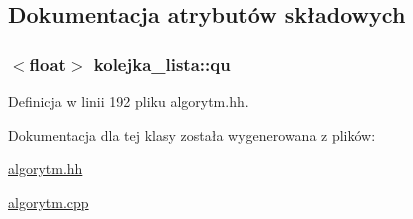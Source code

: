 \subsection{Dokumentacja atrybutów składowych}
\hypertarget{classkolejka__lista_a5e378458ccfc86d903b1a71a8ff5bad8}{
\subsubsection[{qu}]{$<$float$>$ kolejka\-\_\-lista\-::qu\hspace{0.3cm}{\ttfamily [private]}}}\label{classkolejka__lista_a5e378458ccfc86d903b1a71a8ff5bad8}


Definicja w linii 192 pliku algorytm.\-hh.



Dokumentacja dla tej klasy została wygenerowana z plików\-:\begin{DoxyCompactItemize}
\item 
\hyperlink{algorytm_8hh}{algorytm.\-hh}\item 
\hyperlink{algorytm_8cpp}{algorytm.\-cpp}\end{DoxyCompactItemize}
